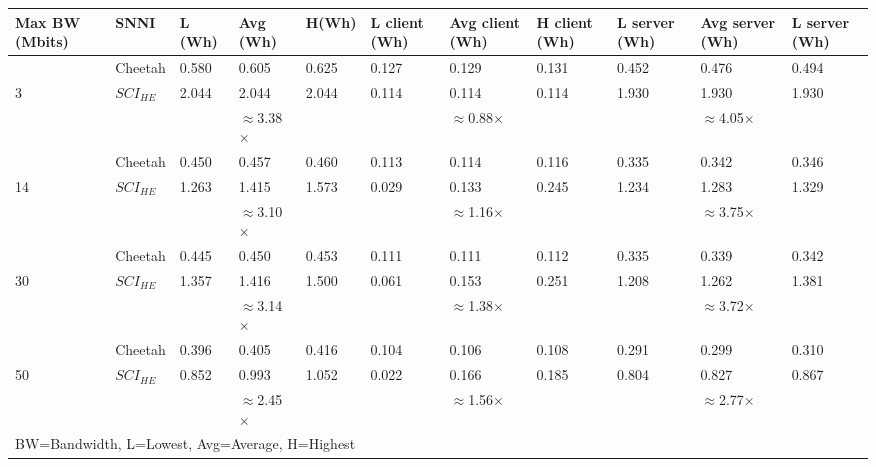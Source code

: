 \begin{tabular}{lllllllllll}
Max BW (Mbits) & SNNI    & L (Wh) & Avg (Wh) & H(Wh) & L client (Wh) & Avg client (Wh) & H client (Wh) & L server (Wh) & Avg server (Wh) & L server (Wh) \\ \hline
               & Cheetah & 0.580  & 0.605    & 0.625 & 0.127         & 0.129           & 0.131         & 0.452         & 0.476           & 0.494         \\
3              & $SCI_{HE}$  & 2.044  & 2.044    & 2.044 & 0.114         & 0.114           & 0.114         & 1.930         & 1.930           & 1.930         \\ \cline{3-11} 
               &         &        & $\approx$3.38$\times$    &       &               & $\approx$0.88$\times$           &               &               & $\approx$4.05$\times$           &               \\ \hline
               & Cheetah & 0.450  & 0.457    & 0.460 & 0.113         & 0.114           & 0.116         & 0.335         & 0.342           & 0.346         \\
14             & $SCI_{HE}$  & 1.263  & 1.415    & 1.573 & 0.029         & 0.133           & 0.245         & 1.234         & 1.283           & 1.329         \\ \cline{3-11} 
               &         &        & $\approx$3.10$\times$    &       &               & $\approx$1.16$\times$           &               &               & $\approx$3.75$\times$           &               \\ \hline
               & Cheetah & 0.445  & 0.450    & 0.453 & 0.111         & 0.111           & 0.112         & 0.335         & 0.339           & 0.342         \\
30             & $SCI_{HE}$  & 1.357  & 1.416    & 1.500 & 0.061         & 0.153           & 0.251         & 1.208         & 1.262           & 1.381         \\ \cline{3-11} 
               &         &        & $\approx$3.14$\times$    &       &               & $\approx$1.38$\times$           &               &               & $\approx$3.72$\times$           &               \\ \hline
               & Cheetah & 0.396  & 0.405    & 0.416 & 0.104         & 0.106           & 0.108         & 0.291         & 0.299           & 0.310         \\
50             & $SCI_{HE}$  & 0.852  & 0.993    & 1.052 & 0.022         & 0.166           & 0.185         & 0.804         & 0.827           & 0.867         \\ \cline{3-11} 
               &         &        & $\approx$2.45$\times$    &       &               & $\approx$1.56$\times$           &               &               & $\approx$2.77$\times$           &               \\ \hline
\multicolumn{11}{l}{BW=Bandwidth, L=Lowest, Avg=Average, H=Highest}                                                                                     
\end{tabular}
